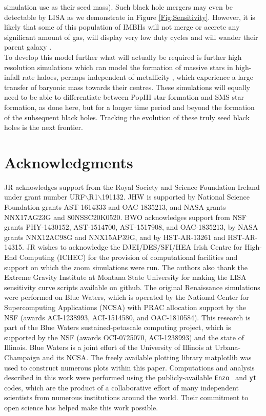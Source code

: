 \documentclass[graphics, twocolumn, usenatbib]{mn2e}
\newcommand{\enzo}{\texttt{Enzo~}}
\newcommand{\yt}{\texttt{yt~}}
\begin{document}
simulation use as their seed mass). Such black hole mergers may even be
detectable by LISA as we demonstrate in Figure \ref{Fig:Sensitivity}. However, it is likely that some of this population of IMBHs will not merge or accrete any significant amount of gas, will display very low duty cycles and will wander their parent galaxy \citep{Tremmel_2018, Reines_2020, Barausse_2020}.\\
\indent To develop this model further what will actually be required is further high
resolution simulations which can model the formation of massive stars in high-infall rate haloes,
perhaps independent of metallicity \citep{Chon_2020, Regan_2020a}, which experience
a large transfer of baryonic mass towards their centres. These simulations will equally need to
be able to differentiate between PopIII star formation and SMS star formation, as done here, but
for a longer time period and beyond the formation of the subsequent black holes.
Tracking the evolution of these truly seed black holes is the next frontier. 

\section*{Acknowledgments}

\noindent JR acknowledges support from the Royal Society and Science Foundation Ireland under
grant number URF$\backslash$R1$\backslash$191132.
JHW is supported by National Science Foundation grants AST-1614333 and
OAC-1835213, and NASA grants NNX17AG23G and 80NSSC20K0520.  
BWO acknowledges support from NSF grants PHY-1430152, AST-1514700, AST-1517908, and  OAC-1835213, by NASA grants NNX12AC98G and NNX15AP39G, and by HST-AR-13261 and HST-AR-14315.
JR wishes to acknowledge the DJEI/DES/SFI/HEA Irish Centre for High-End Computing (ICHEC) for the
provision of computational facilities and support on which the zoom simulations were run.
The authors also thank the Extreme Gravity Institute at Montana State University for making the
LISA sensitivity curve scripts available on github. 
The original Renaissance simulations were performed on Blue 
Waters, which is operated by the National Center for Supercomputing Applications (NCSA)
with PRAC allocation support by the NSF (awards ACI-1238993, ACI-1514580, and OAC-1810584).
This research is part of the Blue Waters sustained-petascale computing project, which
is supported by the NSF (awards OCI-0725070, ACI-1238993) and the state of
Illinois. Blue Waters is a joint effort of the University of Illinois at
Urbana-Champaign and its NCSA.  The freely available plotting library {\sc
matplotlib} \citep{matplotlib} was used to construct numerous plots within this
paper. Computations and analysis described in this work were performed using the
publicly-available \enzo{}\citep{Enzo_2014, Enzo_2019} and \yt{} \citep{YT} codes,
which are the product of a collaborative effort of many independent scientists
from numerous institutions around the world. Their commitment to open science
has helped make this work possible.


\label{lastpage}


\end{document}
